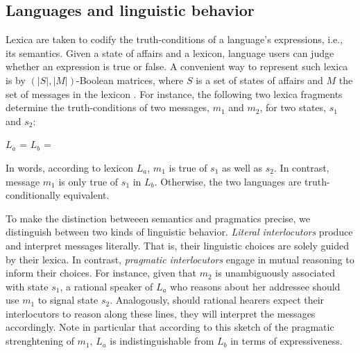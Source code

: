 \documentclass[a4paper]{article}
\begin{document}

\subsection{Languages and linguistic behavior}
Lexica are taken to codify the truth-conditions of a language's expressions, i.e., its semantics. Given a state of affairs and a lexicon, language users can judge whether an expression is true or false. A convenient way to represent such lexica is by $(|S|,|M|)$-Boolean matrices, where $S$ is a set of states of affairs and $M$ the set of messages in the lexicon \citep{franke+jaeger:2014}. For instance, the following two lexica fragments determine the truth-conditions of two messages, $m_1$ and $m_2$, for two states, $s_1$ and $s_2$:

\begin{centering}
$L_a$ =  \hspace{2cm} $L_b$ = \\[0.5cm]
\end{centering}


In words, according to lexicon $L_a$, $m_1$ is true of $s_1$ as well as $s_2$. In contrast, message $m_1$ is only true of $s_1$ in $L_b$. Otherwise, the two languages are truth-conditionally equivalent. 

To make the distinction betweeen semantics and pragmatics precise, we distinguish between two kinds of linguistic behavior. {\em Literal interlocutors} produce and interpret messages literally. That is, their linguistic choices are solely guided by their lexica. In contrast, {\em pragmatic interlocutors} engage in mutual reasoning to inform their choices. For instance, given that $m_2$ is unambiguously associated with state $s_1$, a rational speaker of $L_a$ who reasons about her addressee should use $m_1$ to signal state $s_2$. Analogously, should rational hearers expect their interlocutors to reason along these lines, they will interpret the messages accordingly. Note in particular that according to this sketch of the pragmatic strenghtening of $m_1$, $L_a$ is indistinguishable from $L_b$ in terms of expressiveness.
\end{document}
